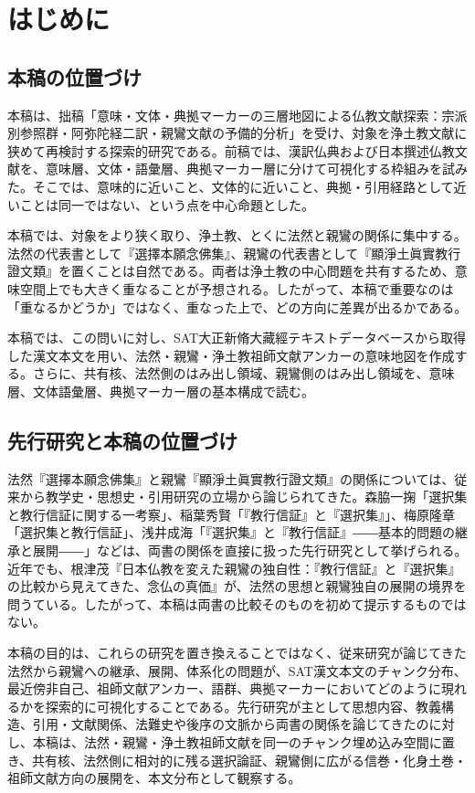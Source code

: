 \documentclass[uplatex,dvipdfmx,11pt,a4paper]{jsarticle}
\begin{document}
\section{はじめに}

\subsection{本稿の位置づけ}

本稿は、拙稿「意味・文体・典拠マーカーの三層地図による仏教文献探索：宗派別参照群・阿弥陀経二訳・親鸞文献の予備的分析」\cite{ueyama2026three-layer-map}を受け、対象を浄土教文献に狭めて再検討する探索的研究である。前稿では、漢訳仏典および日本撰述仏教文献を、意味層、文体・語彙層、典拠マーカー層に分けて可視化する枠組みを試みた。そこでは、意味的に近いこと、文体的に近いこと、典拠・引用経路として近いことは同一ではない、という点を中心命題とした。

本稿では、対象をより狭く取り、浄土教、とくに法然と親鸞の関係に集中する。法然の代表書として『選擇本願念佛集』、親鸞の代表書として『顯淨土眞實教行證文類』を置くことは自然である。両者は浄土教の中心問題を共有するため、意味空間上でも大きく重なることが予想される。したがって、本稿で重要なのは「重なるかどうか」ではなく、重なった上で、どの方向に差異が出るかである。

本稿では、この問いに対し、SAT大正新脩大藏經テキストデータベースから取得した漢文本文を用い、法然・親鸞・浄土教祖師文献アンカーの意味地図を作成する。さらに、共有核、法然側のはみ出し領域、親鸞側のはみ出し領域を、意味層、文体語彙層、典拠マーカー層の基本構成で読む。

\subsection{先行研究と本稿の位置づけ}

法然『選擇本願念佛集』と親鸞『顯淨土眞實教行證文類』の関係については、従来から教学史・思想史・引用研究の立場から論じられてきた。森脇一掬「選択集と教行信証に関する一考察」\cite{moriwaki1953}、稲葉秀賢「『教行信証』と『選択集』」\cite{inaba1972}、梅原隆章「選択集と教行信証」\cite{umehara1974}、浅井成海「『選択集』と『教行信証』――基本的問題の継承と展開――」\cite{asai2004}などは、両書の関係を直接に扱った先行研究として挙げられる。近年でも、根津茂『日本仏教を変えた親鸞の独自性：『教行信証』と『選択集』の比較から見えてきた、念仏の真価』が、法然の思想と親鸞独自の展開の境界を問うている\cite{nezu2024}。したがって、本稿は両書の比較そのものを初めて提示するものではない。

本稿の目的は、これらの研究を置き換えることではなく、従来研究が論じてきた法然から親鸞への継承、展開、体系化の問題が、SAT漢文本文のチャンク分布、最近傍非自己、祖師文献アンカー、語群、典拠マーカーにおいてどのように現れるかを探索的に可視化することである。先行研究が主として思想内容、教義構造、引用・文献関係、法難史や後序の文脈から両書の関係を論じてきたのに対し、本稿は、法然・親鸞・浄土教祖師文献を同一のチャンク埋め込み空間に置き、共有核、法然側に相対的に残る選択論証、親鸞側に広がる信巻・化身土巻・祖師文献方向の展開を、本文分布として観察する。
\end{document}
